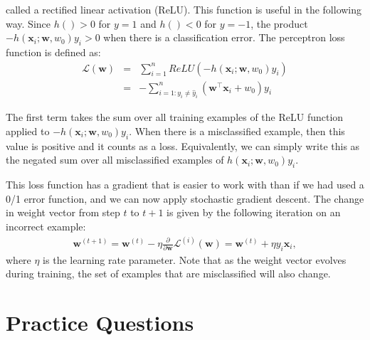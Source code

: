 \documentclass[12pt,letterpaper]{article}
\begin{document}
\noindent called a rectified linear activation (ReLU). This function is useful in the following way. Since $h()>0$ for $y=1$ and $h()<0$ for $y=-1$,
the product $-h(\mathbf{x}_i;\mathbf{w},w_0) y_i>0$ when there is a classification error.
The perceptron loss function is defined as:
\begin{eqnarray}
   \mathcal{L}(\mathbf{w}) &=&  \sum_{i=1}^n ReLU(-h(\mathbf{x}_i;\mathbf{w},w_0) y_i)  \\
    &=&  -\sum_{i=1:y_i \neq \hat{y}_i}^n (\mathbf{w}^\top\mathbf{x}_i + w_0) y_i
\end{eqnarray}

\noindent 
The first term takes the sum over all training examples of the ReLU function
applied to $-h(\mathbf{x}_i;\mathbf{w},w_0) y_i$. When 
there is a misclassified example, then this value is positive
and it counts as a loss. 
Equivalently, we can simply write this as the 
negated sum over all misclassified examples 
of $h(\mathbf{x}_i;\mathbf{w},w_0) y_i$.

This loss function has a gradient that is easier to work with than if we had used a 0/1 error function, and we can now apply stochastic gradient descent. 
%
The change in weight vector from step $t$ to $t+1$ is given by the following
iteration on an incorrect example:
%
\begin{align}
\mathbf{w}^{(t+1)} = \mathbf{w}^{(t)} - \eta \frac{\partial}{\partial \mathbf{w}} \mathcal{L}^{(i)}(\mathbf{w}) = \mathbf{w}^{(t)} + \eta y_i\mathbf{x}_i,
\end{align}
%
\noindent
where $\eta$ is the learning rate parameter. Note that as the weight vector evolves during training, the set of examples that are misclassified will also change.

\newpage

\section{Practice Questions}
\end{document}
